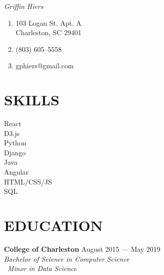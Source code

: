 \documentclass[letterpaper,14pt]{extarticle}
\begin{document}
\begin{multicols}{2}
  \vspace*{10pt}
  \huge {\textit{Grif\phantom{}f\phantom{}in Hiers}}
  \normalsize \\

  \begin{enumerate}[noitemsep]
    \item[]{\faHome{} 103 Logan St. Apt. A\\Charleston, SC 29401}
    \item[]{\faPhone{} (803) 605--5558}
    \item[]{\faEnvelope{} gphiers@gmail.com}
  \end{enumerate}
\end{multicols}
\vspace*{13pt}

\section*{SKILLS}
\begin{multicols}{4}
  React\\
  D3.js\\
  Python\\
  Django\\
  Java\\
  Angular\\
  HTML/CSS/JS\\
  SQL\\
\end{multicols}

\section*{EDUCATION}
  \textbf{College of Charleston}
  \hspace*{\fill}
  \textcolor{color2}{August 2015 --- May 2019}
  \\
  \textcolor{color2}{
    \textit{
      \qquad{}Bachelor of Science in Computer Science
      \\
      \qquad{}\ Minor in Data Science
    }
  }
\end{document}
